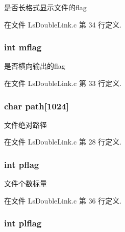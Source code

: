 是否长格式显示文件的flag 



在文件 Ls\-Double\-Link.\-c 第 34 行定义.

\hypertarget{structglobal_args__t_aa52c9d76427dab785a267dfb2c0242b1}{
\subsubsection[{mflag}]{\setlength{\rightskip}{0pt plus 5cm}int mflag}}\label{structglobal_args__t_aa52c9d76427dab785a267dfb2c0242b1}


是否横向输出的flag 



在文件 Ls\-Double\-Link.\-c 第 33 行定义.

\hypertarget{structglobal_args__t_a6f50c85874ef8f3405625e5a26febbcb}{
\subsubsection[{path}]{\setlength{\rightskip}{0pt plus 5cm}char path\mbox{[}1024\mbox{]}}}\label{structglobal_args__t_a6f50c85874ef8f3405625e5a26febbcb}


文件绝对路径 



在文件 Ls\-Double\-Link.\-c 第 28 行定义.

\hypertarget{structglobal_args__t_a3bf178baaa87d9153b6ef764640fe960}{
\subsubsection[{pflag}]{\setlength{\rightskip}{0pt plus 5cm}int pflag}}\label{structglobal_args__t_a3bf178baaa87d9153b6ef764640fe960}


文件个数标量 



在文件 Ls\-Double\-Link.\-c 第 36 行定义.

\hypertarget{structglobal_args__t_a493e07ea63caf467c6817876a2e8a4ea}{
\subsubsection[{plflag}]{\setlength{\rightskip}{0pt plus 5cm}int plflag}}\label{structglobal_args__t_a493e07ea63caf467c6817876a2e8a4ea}


